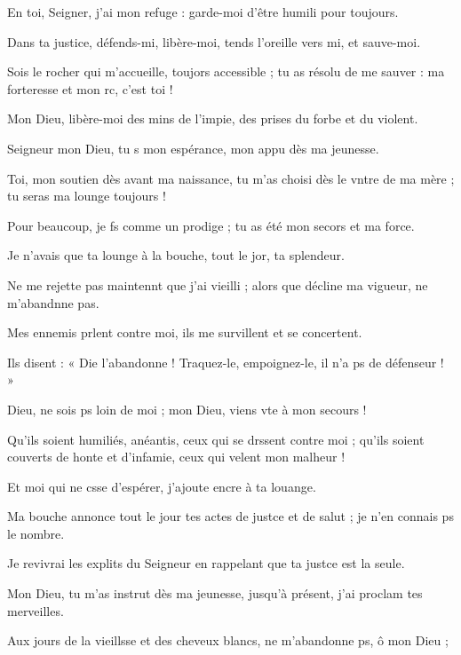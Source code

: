 \item En toi, Seigner, j’ai mon refuge : garde-moi d’être humili pour toujours.
\item Dans ta justice, défends-mi, libère-moi, tends l’oreille vers mi, et sauve-moi.
\item Sois le rocher qui m’accueille, toujors accessible ; tu as résolu de me sauver : ma forteresse et mon rc, c’est toi !
\item Mon Dieu, libère-moi des mins de l’impie, des prises du forbe et du violent.
\item Seigneur mon Dieu, tu s mon espérance, mon appu dès ma jeunesse.
\item Toi, mon soutien dès avant ma naissance, tu m’as choisi dès le vntre de ma mère ; tu seras ma lounge toujours !
\item Pour beaucoup, je fs comme un prodige ; tu as été mon secors et ma force.
\item Je n’avais que ta lounge à la bouche, tout le jor, ta splendeur.
\item Ne me rejette pas maintennt que j’ai vieilli ; alors que décline ma vigueur, ne m’abandnne pas.
\item Mes ennemis prlent contre moi, ils me survillent et se concertent.
\item Ils disent : « Die l’abandonne ! Traquez-le, empoignez-le, il n’a ps de défenseur ! »
\item Dieu, ne sois ps loin de moi ; mon Dieu, viens vte à mon secours !
\item Qu’ils soient humiliés, anéantis, ceux qui se drssent contre moi ; qu’ils soient couverts de honte et d’infamie, ceux qui velent mon malheur !
\item Et moi qui ne csse d’espérer, j’ajoute encre à ta louange.
\item Ma bouche annonce tout le jour tes actes de justce et de salut ; je n’en connais ps le nombre.
\item Je revivrai les explits du Seigneur en rappelant que ta justce est la seule.
\item Mon Dieu, tu m’as instrut dès ma jeunesse, jusqu’à présent, j’ai proclam tes merveilles.
\item Aux jours de la vieillsse et des cheveux blancs, ne m’abandonne ps, ô mon Dieu ; 
